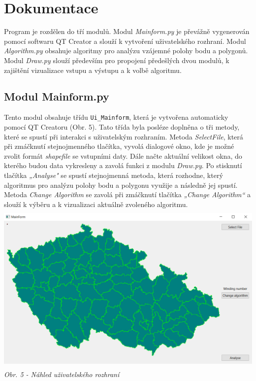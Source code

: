 \documentclass{article}
\begin{document}
\section{\large{Dokumentace}}
Program je rozdělen do tří modulů. Modul \emph{Mainform.py} je převážně vygenerován pomocí softwaru QT Creator a slouží k vytvoření uživatelského rozhraní. Modul \emph{Algorithm.py} obsahuje algoritmy pro analýzu vzájemné polohy bodu a polygonů. Modul \emph{Draw.py} slouží především pro propojení předešlých dvou modulů, k zajištění vizualizace vstupu a výstupu a k volbě algoritmu.
\subsection{\small{Modul Mainform.py}}
Tento modul obsahuje třídu \texttt{Ui\_Mainform}, která je vytvořena automaticky pomocí QT Creatoru (Obr. 5). Tato třída byla posléze doplněna o  tři metody, které se spustí při interakci s uživatelským rozhraním. Metoda \emph{SelectFile}, která při zmáčknutí stejnojmenného tlačítka, vyvolá dialogové okno, kde je možné zvolit formát \emph{shapefile} se vstupními daty. Dále načte aktuální velikost okna, do kterého budou data vykresleny a zavolá funkci z modulu \emph{Draw.py}. Po stisknutí tlačítka \emph{„Analyse"} se spustí stejnojmenná metoda, která rozhodne, který algoritmus pro analýzu polohy bodu a polygonu využije a následně jej spustí. Metoda \emph{Change Algorithm} se zavolá při zmáčknutí tlačítka \emph{„Change Algorithm“} a slouží k výběru a k vizualizaci aktuálně zvoleného algoritmu.\\
\includegraphics[height=85mm]{images/p_i_p.PNG}\bigskip\\
\textit{\footnotesize{Obr. 5 - Náhled uživatelského rozhraní}}
\end{document}

